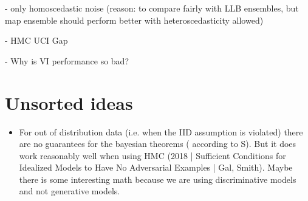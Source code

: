 \documentclass[12pt, A4, twoside]{report}
\begin{document}
- only homoscedastic noise (reason: to compare fairly with LLB ensembles, but map ensemble should perform better with heteroscedasticity allowed)

- HMC UCI Gap

- Why is VI performance so bad?

\chapter{Unsorted ideas}
\begin{itemize}
  \item For out of distribution data (i.e. when the IID assumption is violated) there are no guarantees for the bayesian theorems ( according to S). But it does work reasonably well when using HMC (2018 | Sufficient Conditions for Idealized Models to Have No Adversarial Examples | Gal, Smith). Maybe there is some interesting math because we are using discriminative models and not generative models.
  

\end{itemize}
\end{document}
